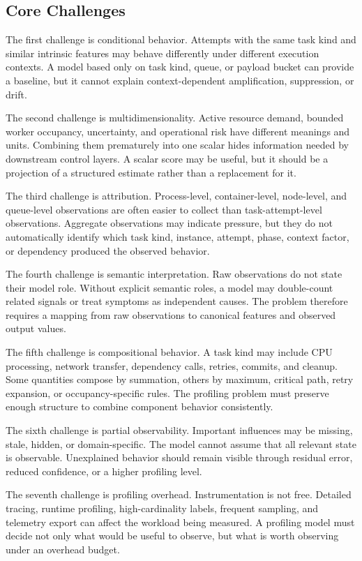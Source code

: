 \subsection{Core Challenges}
\label{sec:problem-core-challenges}

The first challenge is conditional behavior. Attempts with the same task kind
and similar intrinsic features may behave differently under different execution
contexts. A model based only on task kind, queue, or payload bucket can provide a
baseline, but it cannot explain context-dependent amplification, suppression, or
drift.

The second challenge is multidimensionality. Active resource demand, bounded
worker occupancy, uncertainty, and operational risk have different meanings and
units. Combining them prematurely into one scalar hides information needed by
downstream control layers. A scalar score may be useful, but it should be a
projection of a structured estimate rather than a replacement for it.

The third challenge is attribution. Process-level, container-level, node-level,
and queue-level observations are often easier to collect than
task-attempt-level observations. Aggregate observations may indicate pressure,
but they do not automatically identify which task kind, instance, attempt,
phase, context factor, or dependency produced the observed behavior.

The fourth challenge is semantic interpretation. Raw observations do not state
their model role. Without explicit semantic roles, a model may double-count
related signals or treat symptoms as independent causes. The problem therefore
requires a mapping from raw observations to canonical features and observed
output values.

The fifth challenge is compositional behavior. A task kind may include CPU
processing, network transfer, dependency calls, retries, commits, and cleanup.
Some quantities compose by summation, others by maximum, critical path, retry
expansion, or occupancy-specific rules. The profiling problem must preserve
enough structure to combine component behavior consistently.

The sixth challenge is partial observability. Important influences may be
missing, stale, hidden, or domain-specific. The model cannot assume that all
relevant state is observable. Unexplained behavior should remain visible through
residual error, reduced confidence, or a higher profiling level.

The seventh challenge is profiling overhead. Instrumentation is not free.
Detailed tracing, runtime profiling, high-cardinality labels, frequent sampling,
and telemetry export can affect the workload being measured. A profiling model
must decide not only what would be useful to observe, but what is worth observing
under an overhead budget.

